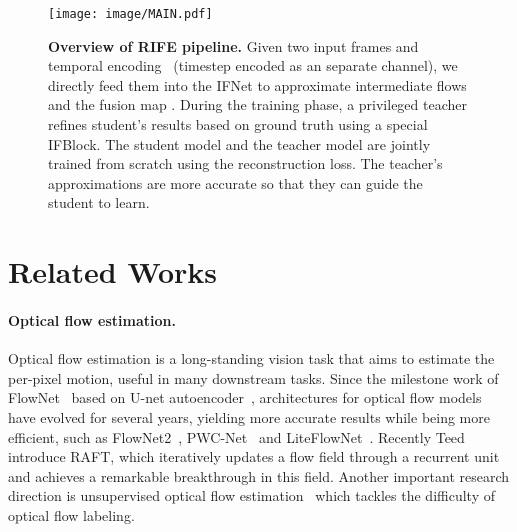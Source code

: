 \documentclass[final]{cvpr}
\begin{document}
\begin{figure*}
	\centering
	\texttt{[image: image/MAIN.pdf]}
	\caption{\textbf{Overview of RIFE pipeline.} Given two input frames  and temporal encoding ~(timestep encoded as an separate channel), we directly feed them into the IFNet to approximate intermediate flows  and the fusion map . During the training phase, a privileged teacher refines student's results based on ground truth  using a special IFBlock. The student model and the teacher model are jointly trained from scratch using the reconstruction loss. The teacher's approximations are more accurate so that they can guide the student to learn. }\label{fig:main}
\end{figure*} 	\section{Related Works}
\paragraph{Optical flow estimation.} Optical flow estimation is a long-standing vision task that aims to estimate the per-pixel motion, useful in many downstream tasks. Since the milestone work of FlowNet~\cite{dosovitskiy2015flownet} based on U-net autoencoder~\cite{ronneberger2015u}, architectures for optical flow models have evolved for several years, yielding more accurate results while being more efficient, such as FlowNet2~\cite{ilg2017flownet}, PWC-Net~\cite{sun2018pwc} and LiteFlowNet~\cite{hui2018liteflownet}. Recently Teed~\etal~\cite{teed2020raft} introduce RAFT, which iteratively updates a flow field through a recurrent unit and achieves a remarkable breakthrough in this field. Another important research direction is unsupervised optical flow estimation~\cite{meister2017unflow, jonschkowski2020matters, luo2020upflow} which tackles the difficulty of optical flow labeling.
\end{document}
